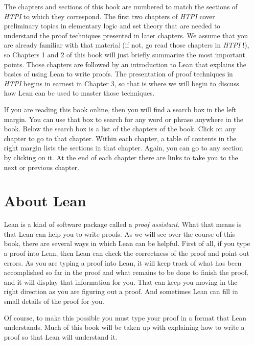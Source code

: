 \documentclass[
  letterpaper,
  DIV=11,
  numbers=noendperiod]{scrreprt}
\theoremstyle{remark}
\begin{document}
The chapters and sections of this book are numbered to match the
sections of \emph{HTPI} to which they correspond. The first two chapters
of \emph{HTPI} cover preliminary topics in elementary logic and set
theory that are needed to understand the proof techniques presented in
later chapters. We assume that you are already familiar with that
material (if not, go read those chapters in \emph{HTPI} !), so Chapters
1 and 2 of this book will just briefly summarize the most important
points. Those chapters are followed by an introduction to Lean that
explains the basics of using Lean to write proofs. The presentation of
proof techniques in \emph{HTPI} begins in earnest in Chapter 3, so that
is where we will begin to discuss how Lean can be used to master those
techniques.

If you are reading this book online, then you will find a search box in
the left margin. You can use that box to search for any word or phrase
anywhere in the book. Below the search box is a list of the chapters of
the book. Click on any chapter to go to that chapter. Within each
chapter, a table of contents in the right margin lists the sections in
that chapter. Again, you can go to any section by clicking on it. At the
end of each chapter there are links to take you to the next or previous
chapter.

\hypertarget{about-lean}{%
\section*{About Lean}\label{about-lean}}

Lean is a kind of software package called a \emph{proof assistant}. What
that means is that Lean can help you to write proofs. As we will see
over the course of this book, there are several ways in which Lean can
be helpful. First of all, if you type a proof into Lean, then Lean can
check the correctness of the proof and point out errors. As you are
typing a proof into Lean, it will keep track of what has been
accomplished so far in the proof and what remains to be done to finish
the proof, and it will display that information for you. That can keep
you moving in the right direction as you are figuring out a proof. And
sometimes Lean can fill in small details of the proof for you.

Of course, to make this possible you must type your proof in a format
that Lean understands. Much of this book will be taken up with
explaining how to write a proof so that Lean will understand it.
\end{document}
